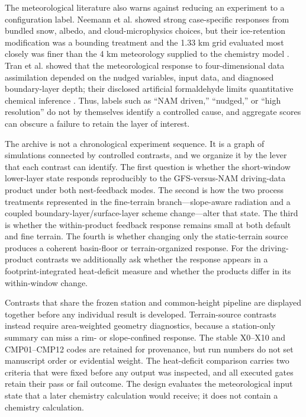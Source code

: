 \documentclass[air,article,submit,moreauthors]{Definitions/mdpi}
\begin{document}
The meteorological literature also warns against reducing an experiment to a configuration label.
Neemann et al. showed strong case-specific responses from bundled snow, albedo, and cloud-microphysics choices, but their ice-retention modification was a bounding treatment and the 1.33 km grid evaluated most closely was finer than the 4 km meteorology supplied to the chemistry model \citep{Neemann2015-ws}.
Tran et al. showed that the meteorological response to four-dimensional data assimilation depended on the nudged variables, input data, and diagnosed boundary-layer depth; their disclosed artificial formaldehyde limits quantitative chemical inference \citep{Tran2018-cx}.
Thus, labels such as ``NAM driven,'' ``nudged,'' or ``high resolution'' do not by themselves identify a controlled cause, and aggregate scores can obscure a failure to retain the layer of interest.

The archive is not a chronological experiment sequence.
It is a graph of simulations connected by controlled contrasts, and we organize it by the lever that each contrast can identify.
The first question is whether the short-window lower-layer state responds reproducibly to the GFS-versus-NAM driving-data product under both nest-feedback modes.
The second is how the two process treatments represented in the fine-terrain branch---slope-aware radiation and a coupled boundary-layer/surface-layer scheme change---alter that state.
The third is whether the within-product feedback response remains small at both default and fine terrain.
The fourth is whether changing only the static-terrain source produces a coherent basin-floor or terrain-organized response.
For the driving-product contrasts we additionally ask whether the response appears in a footprint-integrated heat-deficit measure and whether the products differ in its within-window change.

Contrasts that share the frozen station and common-height pipeline are displayed together before any individual result is developed.
Terrain-source contrasts instead require area-weighted geometry diagnostics, because a station-only summary can miss a rim- or slope-confined response.
The stable X0--X10 and CMP01--CMP12 codes are retained for provenance, but run numbers do not set manuscript order or evidential weight.
The heat-deficit comparison carries two criteria that were fixed before any output was inspected, and all executed gates retain their pass or fail outcome.
The design evaluates the meteorological input state that a later chemistry calculation would receive; it does not contain a chemistry calculation.
\end{document}
